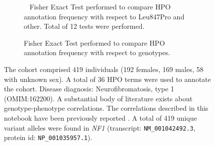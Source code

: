 \begin{figure}[htbp]
\begin{subfigure}[b]{0.95\textwidth}
\centering
{}
\captionsetup{justification=raggedright,singlelinecheck=false}
\caption{         Fisher Exact Test performed to compare HPO annotation frequency with respect to Leu847Pro and other. Total of
        12 tests were performed. }
\end{subfigure}

\begin{subfigure}[b]{0.95\textwidth}
\centering
{}
\captionsetup{justification=raggedright,singlelinecheck=false}
\caption{Fisher Exact Test performed to compare HPO annotation frequency with respect to genotypes. }
\end{subfigure}



\caption{ The cohort comprised 419 individuals (192 females, 169 males, 58 with unknown sex). A total of 36 HPO terms were used to annotate the cohort. Disease diagnosis: Neurofibromatosis, type 1 (OMIM:162200). A substantial body of literature exists about genotype-phenotype correlations. The correlations described in this notebook
have been previously reported \cite{PMID_26178382,PMID_17160901,PMID_20513137}.
 A total of 419 unique variant alleles were found in \textit{NF1} (transcript: \texttt{NM\_001042492.3}, protein id: \texttt{NP\_001035957.1}).}
\end{figure}
